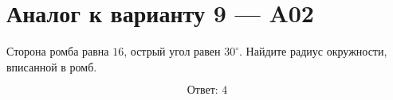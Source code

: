 


\section*{Аналог к варианту 9 — A02}
Сторона ромба равна \(16\), острый угол равен \(30^\circ\). Найдите радиус окружности, вписанной в ромб.
\begin{center}\end{center}
\[\boxed{\text{Ответ: }4}\]

